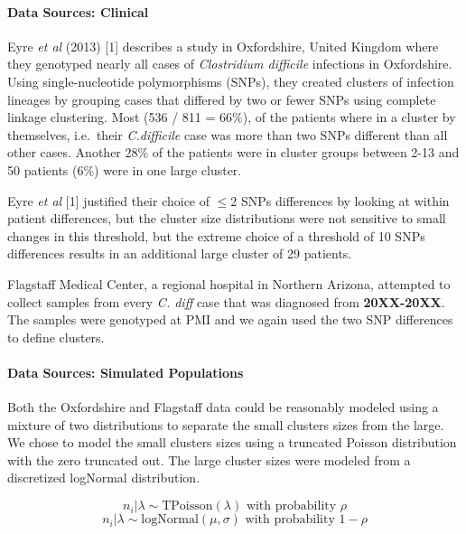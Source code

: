 \documentclass[]{article}
\let\oldparagraph\paragraph
\renewcommand{\paragraph}[1]{\oldparagraph{#1}\mbox{}}
\begin{document}
\hypertarget{data-sources-clinical}{%
\paragraph{Data Sources: Clinical}\label{data-sources-clinical}}

Eyre \emph{et al} (2013) {[}1{]} describes a study in Oxfordshire,
United Kingdom where they genotyped nearly all cases of
\emph{Clostridium difficile} infections in Oxfordshire. Using
single-nucleotide polymorphisms (SNPs), they created clusters of
infection lineages by grouping cases that differed by two or fewer SNPs
using complete linkage clustering. Most (536 / 811 = 66\%), of the
patients where in a cluster by themselves, i.e.~their \emph{C.difficile}
case was more than two SNPs different than all other cases. Another 28\%
of the patients were in cluster groups between 2-13 and 50 patients
(6\%) were in one large cluster.

Eyre \emph{et al} {[}1{]} justified their choice of \(\le 2\) SNPs
differences by looking at within patient differences, but the cluster
size distributions were not sensitive to small changes in this
threshold, but the extreme choice of a threshold of 10 SNPs differences
results in an additional large cluster of 29 patients.

Flagstaff Medical Center, a regional hospital in Northern Arizona,
attempted to collect samples from every \emph{C. diff} case that was
diagnosed from \textbf{20XX-20XX}. The samples were genotyped at PMI and
we again used the two SNP differences to define clusters.

\hypertarget{data-sources-simulated-populations}{%
\paragraph{Data Sources: Simulated
Populations}\label{data-sources-simulated-populations}}

Both the Oxfordshire and Flagstaff data could be reasonably modeled
using a mixture of two distributions to separate the small clusters
sizes from the large. We chose to model the small clusters sizes using a
truncated Poisson distribution with the zero truncated out. The large
cluster sizes were modeled from a discretized logNormal distribution.

\[n_i | \lambda \sim \textrm{TPoisson}(\lambda) \textrm{ with probability } \rho\]
\[n_i | \lambda \sim \textrm{logNormal}(\mu, \sigma) \textrm{ with probability } 1 - \rho\]
\end{document}
